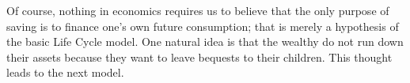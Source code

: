 \documentclass[titlepage,12pt]{article}
\begin{document}


Of course, nothing in economics requires us to believe that the only 
purpose of saving is to finance one's own future consumption; that is 
merely a hypothesis of the basic Life Cycle model.  One natural idea is 
that the wealthy do not run down their assets because they want to 
leave bequests to their children.  This thought leads to the next model.
\end{document}
